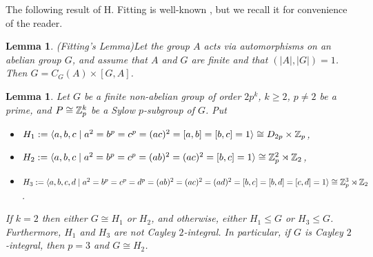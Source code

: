 \documentclass{amsart}
\newtheorem{lem}[thm]{Lemma}
\def \leq {\leqslant}
\def \geq {\geqslant}
\begin{document}
	The following result of H. Fitting is well-known \cite[Theorem 4.34]{Issacs}, but we recall it for convenience of the reader.
	\begin{lem}(Fitting's Lemma)\label{fit}
		Let the group $A$ acts via automorphisms on an abelian group $G$, and assume that $A$ and $G$ are finite and that $(|A|,|G|)=1$. Then $G=C_G(A)\times [G,A]$. 
	\end{lem}
	\begin{lem}\label{main3k2}
		Let $G$ be a finite non-abelian group of order $2p^k$, $k\geq 2$, $p\neq 2$ be a prime, and $P\cong\Bbb Z_p^k$ be a Sylow $p$-subgroup of $G$. Put
		\begin{itemize}
			\item[(a)] $H_1:=\langle a,b,c\mid a^2=b^p=c^p=(ac)^2=[a,b]=[b,c]=1\rangle\cong D_{2p}\times\Bbb Z_p$,
			\item[(b)] $H_2:=\langle a,b,c\mid a^2=b^p=c^p=(ab)^2=(ac)^2=[b,c]=1\rangle\cong\Bbb Z_p^2\rtimes\Bbb Z_2$,
			\item[(c)] $H_3:=\langle a,b,c,d\mid a^2=b^p=c^p=d^p=(ab)^2=(ac)^2=(ad)^2=[b,c]=[b,d]=[c,d]=1\rangle\cong \Bbb Z_p^3\rtimes\Bbb Z_2$.
		\end{itemize} 
			If $k=2$ then either $G\cong H_1$ or $H_2$, and otherwise, either $H_1\leq G$ or $H_3\leq G$. Furthermore, $H_1$ and $H_3$ are not Cayley $2$-integral. In particular, if $G$ is Cayley $2$-integral, then $p=3$ and $G\cong H_2$.
	\end{lem}
\end{document}
